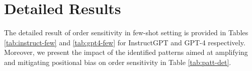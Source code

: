 \documentclass[11pt]{article}
\begin{document}






\appendix

\section{Detailed Results}
\label{sec:appendix}
The detailed result of order sensitivity in few-shot setting is provided in Tables \ref{tab:instruct-few} and \ref{tab:gpt4-few} for InstructGPT and GPT-4 respectively. 
Moreover, we present the impact of the identified patterns aimed at amplifying and mitigating positional bias on order sensitivity in Table \ref{tab:patt-det}. 
\end{document}
